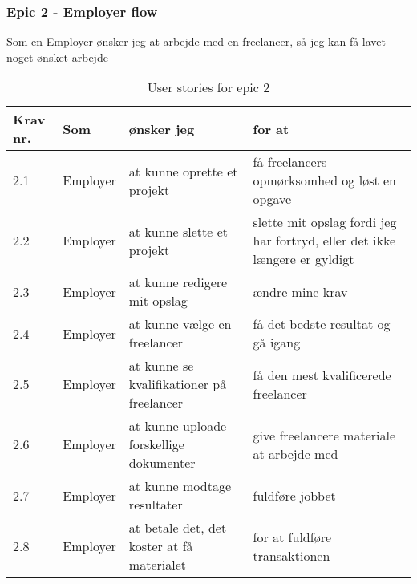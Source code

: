 \subsubsection{Epic 2 - Employer flow}

Som en Employer ønsker jeg at arbejde med en freelancer, så jeg kan få lavet noget ønsket arbejde

\begin{table}[H]
    \centering
    \caption{User stories for epic 2}
    \label{tab:us-epic2}
    \begin{tabular}{l|l|l|l}
        \textbf{Krav nr.} & \textbf{Som} & \textbf{ønsker jeg}                        & \textbf{for at}                                                                                     \\
        \hline
        2.1               & Employer     & at kunne oprette et projekt                & få freelancers opmørksomhed og løst en opgave                                                       \\
        \hline
        2.2               & Employer     & at kunne slette et projekt                 & \multicolumn{1}{p{6cm}}{slette mit opslag fordi jeg har fortryd, eller det ikke længere er gyldigt} \\
        \hline
        2.3               & Employer     & at kunne redigere mit opslag               & ændre mine krav                                                                                     \\
        \hline
        2.4               & Employer     & at kunne vælge en freelancer               & få det bedste resultat og gå igang                                                                  \\
        \hline
        2.5               & Employer     & at kunne se kvalifikationer på freelancer  & få den mest kvalificerede freelancer                                                                \\
        \hline
        2.6               & Employer     & at kunne uploade forskellige dokumenter    & give freelancere materiale at arbejde med                                                           \\
        \hline
        2.7               & Employer     & at kunne modtage resultater                & fuldføre jobbet                                                                                     \\
        \hline
        2.8               & Employer     & at betale det, det koster at få materialet & for at fuldføre transaktionen                                                                       \\
    \end{tabular}
\end{table}

